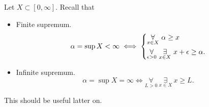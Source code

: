 \begin{prev}
	Let \(X\subset [0, \infty ]\). Recall that
	\begin{itemize}
		\item Finite supremum.
		      \[
			      \alpha = \sup X < \infty \iff \begin{dcases}
				      \underset{x\in X}{\forall }\ \alpha \geq x \\
				      \underset{\epsilon >0}{\forall }\ \underset{x\in X}{\exists } \ x+\epsilon \geq \alpha.
			      \end{dcases}
		      \]
		\item Infinite supremum.
		      \[
			      \alpha  = \sup X = \infty \iff \underset{L>0}{\forall }\ \underset{x\in X}{\exists }\ x\geq L.
		      \]
	\end{itemize}
	This should be useful latter on.
\end{prev}

